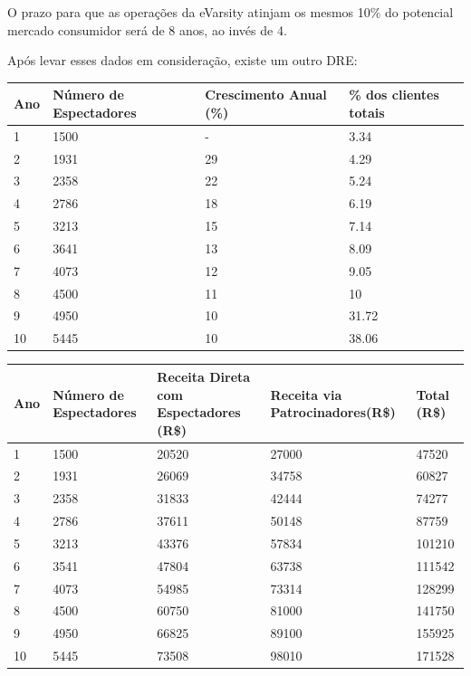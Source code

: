 \documentclass[a4paper, 12pt]{paper}
\begin{document}
O prazo para que as operações da eVarsity atinjam os mesmos 10\% do potencial mercado consumidor será de 8 anos, ao invés de 4.

Após levar esses dados em consideração, existe um outro DRE:

\begin{table}[ht]
	\centering
	\begin{tabular}{p{1cm}p{4.5cm}p{4.2cm}p{4cm}}
		\hline
		\cellcolor{gray}Ano&\cellcolor{gray}Número de Espectadores&\cellcolor{gray}Crescimento Anual (\%)&\cellcolor{gray}\% dos clientes totais\\
		\hline
	1 & 1500 & - & 3.34 \\ 
	2 & 1931 & 29 & 4.29 \\ 
	3 & 2358 & 22 & 5.24\\ 
	4 & 2786 & 18 & 6.19 \\ 
	5 & 3213 & 15 & 7.14 \\ 
	6 & 3641 & 13 & 8.09 \\ 
	7 & 4073 & 12 & 9.05 \\ 
	8 & 4500 & 11 & 10 \\ 
	9 & 4950 & 10 & 31.72 \\ 
	10 & 5445 & 10 & 38.06 \\ \hline
		\end{tabular}
	\end{table}

\begin{table}[ht]
	\centering
	\begin{tabular}{p{1cm}p{3cm}p{3.5cm}p{3.5cm}p{3cm}}
		\hline
		\cellcolor{gray}Ano&\cellcolor{gray}Número de Espectadores&\cellcolor{gray}Receita Direta com Espectadores (R\$)&\cellcolor{gray}Receita via Patrocinadores(R\$)&\cellcolor{gray}Total (R\$)\\
		\hline
	1 & 1500 & 20520 & 27000 & 47520 \\ 
	2 & 1931 & 26069 & 34758 & 60827 \\ 
	3 & 2358 & 31833 & 42444 & 74277 \\ 
	4 & 2786 & 37611 & 50148 & 87759 \\ 
	5 & 3213 & 43376 & 57834 & 101210 \\ 
	6 & 3541 & 47804 & 63738 & 111542 \\ 
	7 & 4073 & 54985 & 73314 & 128299 \\ 
	8 & 4500 & 60750 & 81000 & 141750 \\ 
	9 & 4950 & 66825 & 89100 & 155925 \\ 
	10 & 5445 & 73508 & 98010 & 171528 \\ \hline
		\end{tabular}
	\end{table}
\end{document}
